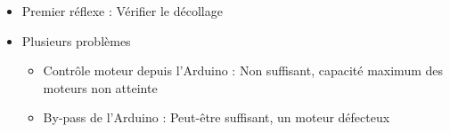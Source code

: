 \documentclass{beamer}
\begin{document}
{	\begin{frame} %
	  \begin{itemize}
	    \item Premier réflexe : Vérifier le décollage
	    \item Plusieurs problèmes
	    \begin{itemize}
	      \item Contrôle moteur depuis l'Arduino : Non suffisant, capacité maximum des moteurs non atteinte
	      \item By-pass de l'Arduino : Peut-être suffisant, un moteur défecteux
	    \end{itemize}
	  \end{itemize}
	\end{frame}
	
	\begin{frame} %
	  \par
	\end{frame}
  }
  
\end{document}
